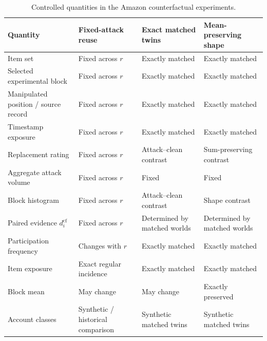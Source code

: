 \begin{table}[t]
\caption{Controlled quantities in the Amazon counterfactual experiments.}
\label{tab:supp-controls}
\centering
\small
\setlength{\tabcolsep}{5pt}
\renewcommand{\arraystretch}{1.08}
\begin{tabularx}{\textwidth}{@{}lXXX@{}}
\toprule
\textbf{Quantity}
&
\textbf{Fixed-attack reuse}
&
\textbf{Exact matched twins}
&
\textbf{Mean-preserving shape}
\\
\midrule

Item set
& Fixed across $r$
& Exactly matched
& Exactly matched \\

Selected experimental block
& Fixed across $r$
& Exactly matched
& Exactly matched \\

Manipulated position / source record
& Fixed across $r$
& Exactly matched
& Exactly matched \\

Timestamp exposure
& Fixed across $r$
& Exactly matched
& Exactly matched \\

Replacement rating
& Fixed across $r$
& Attack--clean contrast
& Sum-preserving contrast \\

Aggregate attack volume
& Fixed across $r$
& Fixed
& Fixed \\

Block histogram
& Fixed across $r$
& Attack--clean contrast
& Shape contrast \\

Paired evidence $d_i^{\mathrm{cf}}$
& Fixed across $r$
& Determined by matched worlds
& Determined by matched worlds \\

Participation frequency
& Changes with $r$
& Exactly matched
& Exactly matched \\

Item exposure
& Exact regular incidence
& Exactly matched
& Exactly matched \\

Block mean
& May change
& May change
& Exactly preserved \\

Account classes
& Synthetic / historical comparison
& Synthetic matched twins
& Synthetic matched twins \\

\bottomrule
\end{tabularx}
\end{table}



